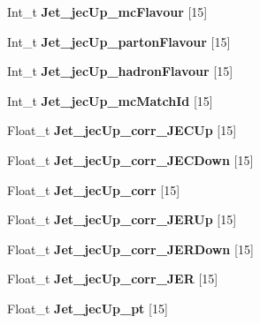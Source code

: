 \begin{DoxyCompactItemize}
Int\+\_\+t {\bfseries Jet\+\_\+jec\+Up\+\_\+mc\+Flavour} \mbox{[}15\mbox{]}
\item 
\hypertarget{classMiniTree_ab4d315063de5e37a30217793259b18f7}{}\label{classMiniTree_ab4d315063de5e37a30217793259b18f7} 
Int\+\_\+t {\bfseries Jet\+\_\+jec\+Up\+\_\+parton\+Flavour} \mbox{[}15\mbox{]}
\item 
\hypertarget{classMiniTree_ab72a079a806ff74206cf4f4d09b1f4a6}{}\label{classMiniTree_ab72a079a806ff74206cf4f4d09b1f4a6} 
Int\+\_\+t {\bfseries Jet\+\_\+jec\+Up\+\_\+hadron\+Flavour} \mbox{[}15\mbox{]}
\item 
\hypertarget{classMiniTree_af62007f366bdf5272d6fd33ce72bcc49}{}\label{classMiniTree_af62007f366bdf5272d6fd33ce72bcc49} 
Int\+\_\+t {\bfseries Jet\+\_\+jec\+Up\+\_\+mc\+Match\+Id} \mbox{[}15\mbox{]}
\item 
\hypertarget{classMiniTree_a398d0b97aa368df2a700bda525563b84}{}\label{classMiniTree_a398d0b97aa368df2a700bda525563b84} 
Float\+\_\+t {\bfseries Jet\+\_\+jec\+Up\+\_\+corr\+\_\+\+J\+E\+C\+Up} \mbox{[}15\mbox{]}
\item 
\hypertarget{classMiniTree_a17f1199a9412364815de5b12d71e0f8f}{}\label{classMiniTree_a17f1199a9412364815de5b12d71e0f8f} 
Float\+\_\+t {\bfseries Jet\+\_\+jec\+Up\+\_\+corr\+\_\+\+J\+E\+C\+Down} \mbox{[}15\mbox{]}
\item 
\hypertarget{classMiniTree_a8df4279ca91a5729e9d8ef552315c41a}{}\label{classMiniTree_a8df4279ca91a5729e9d8ef552315c41a} 
Float\+\_\+t {\bfseries Jet\+\_\+jec\+Up\+\_\+corr} \mbox{[}15\mbox{]}
\item 
\hypertarget{classMiniTree_a3cf17926c777ada1b4089206e3914cdc}{}\label{classMiniTree_a3cf17926c777ada1b4089206e3914cdc} 
Float\+\_\+t {\bfseries Jet\+\_\+jec\+Up\+\_\+corr\+\_\+\+J\+E\+R\+Up} \mbox{[}15\mbox{]}
\item 
\hypertarget{classMiniTree_a30cfd6fb65ef9a8ad8965154b5948d05}{}\label{classMiniTree_a30cfd6fb65ef9a8ad8965154b5948d05} 
Float\+\_\+t {\bfseries Jet\+\_\+jec\+Up\+\_\+corr\+\_\+\+J\+E\+R\+Down} \mbox{[}15\mbox{]}
\item 
\hypertarget{classMiniTree_a32a3f41221285bf073770dde60e1da16}{}\label{classMiniTree_a32a3f41221285bf073770dde60e1da16} 
Float\+\_\+t {\bfseries Jet\+\_\+jec\+Up\+\_\+corr\+\_\+\+J\+ER} \mbox{[}15\mbox{]}
\item 
\hypertarget{classMiniTree_a0c6c70875f5bac96aa708d8cd4ed70a7}{}\label{classMiniTree_a0c6c70875f5bac96aa708d8cd4ed70a7} 
Float\+\_\+t {\bfseries Jet\+\_\+jec\+Up\+\_\+pt} \mbox{[}15\mbox{]}
\item 

\end{DoxyCompactItemize}
